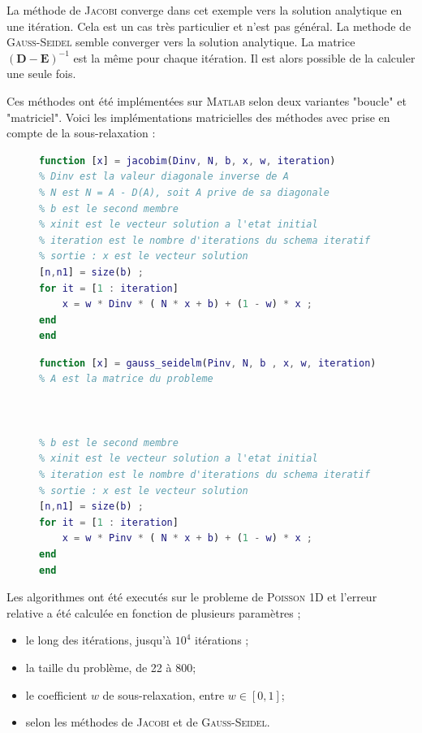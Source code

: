 \documentclass[12pt]{report}
\newcommand{\E}{\mathbf{E}}
\newcommand{\D}{\mathbf{D}}
\begin{document}
La méthode de \textsc{Jacobi} converge dans cet exemple vers la solution analytique en une itération. Cela est un cas très particulier et n'est pas général. La methode de \textsc{Gauss-Seidel} semble converger vers la solution analytique. La matrice $\left( \D - \E \right)^{-1}$ est la même pour chaque itération. Il est alors possible de la calculer une seule fois. 


Ces méthodes ont été implémentées sur \textsc{Matlab} selon deux variantes "boucle" et "matriciel". Voici les implémentations matricielles des méthodes avec prise en compte de la sous-relaxation : 


\begin{figure}[H]
\begin{minipage}{0.5\textwidth}
\begin{lstlisting}[language=Matlab, caption=Jacobi]
function [x] = jacobim(Dinv, N, b, x, w, iteration)
% Dinv est la valeur diagonale inverse de A
% N est N = A - D(A), soit A prive de sa diagonale
% b est le second membre
% xinit est le vecteur solution a l'etat initial
% iteration est le nombre d'iterations du schema iteratif
% sortie : x est le vecteur solution
[n,n1] = size(b) ;
for it = [1 : iteration]
    x = w * Dinv * ( N * x + b) + (1 - w) * x ;  
end
end
\end{lstlisting}
\end{minipage}
\begin{minipage}{0.499\textwidth}
\begin{lstlisting}[language=Matlab, caption=Gauss-Seidel]
function [x] = gauss_seidelm(Pinv, N, b , x, w, iteration)
% A est la matrice du probleme



% b est le second membre
% xinit est le vecteur solution a l'etat initial
% iteration est le nombre d'iterations du schema iteratif
% sortie : x est le vecteur solution
[n,n1] = size(b) ;
for it = [1 : iteration]
    x = w * Pinv * ( N * x + b) + (1 - w) * x ; 
end
end
\end{lstlisting}
\end{minipage}
\end{figure}
Les algorithmes ont été executés sur le probleme de \textsc{Poisson} 1D et l'erreur relative a été calculée en fonction de plusieurs paramètres ; 
\begin{itemize}
\item le long des itérations, jusqu'à $10^4$ itérations ;
\item la taille du problème, de 22 à 800;
\item le coefficient $w$ de sous-relaxation, entre $w \in [0, 1]$;
\item selon les méthodes de \textsc{Jacobi} et de \textsc{Gauss-Seidel}.
\end{itemize}
\end{document}
